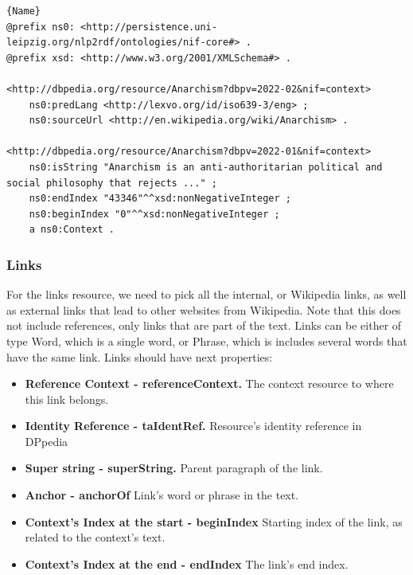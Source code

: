 \documentclass[thesis=M,english,hidelinks]{FITthesis}[2019/12/23]
\begin{document}
\begin{lstlisting}[caption=Example of an output for context in NIF format,frame=tlrb,  label = {lst:nif-context}]{Name}
@prefix ns0: <http://persistence.uni-leipzig.org/nlp2rdf/ontologies/nif-core#> .
@prefix xsd: <http://www.w3.org/2001/XMLSchema#> .

<http://dbpedia.org/resource/Anarchism?dbpv=2022-02&nif=context>
	ns0:predLang <http://lexvo.org/id/iso639-3/eng> ;
	ns0:sourceUrl <http://en.wikipedia.org/wiki/Anarchism> .

<http://dbpedia.org/resource/Anarchism?dbpv=2022-01&nif=context>
	ns0:isString "Anarchism is an anti-authoritarian political and social philosophy that rejects ..." ;
	ns0:endIndex "43346"^^xsd:nonNegativeInteger ;
	ns0:beginIndex "0"^^xsd:nonNegativeInteger ;
	a ns0:Context .
\end{lstlisting}

\subsubsection{Links}

For the links resource, we need to pick all the internal, or Wikipedia links, as well as external links that lead to other websites from Wikipedia. Note that this does not include references, only links that are part of the text. Links can be either of type Word, which is a single word, or Phrase, which is includes several words that have the same link. Links should have next properties:

\begin{itemize}
	\item \textbf{Reference Context - referenceContext.} The context resource to where this link belongs.
	\item \textbf{Identity Reference - taIdentRef.} Resource's identity reference in DPpedia
	\item \textbf{Super string - superString.} Parent paragraph of the link.
	\item \textbf{Anchor - anchorOf} Link's word or phrase in the text.
	\item \textbf{Context's Index at the start - beginIndex} Starting index of the link, as related to the context's text.
	\item \textbf{Context's Index at the end - endIndex} The link's end index.
\end{itemize}
\end{document}
